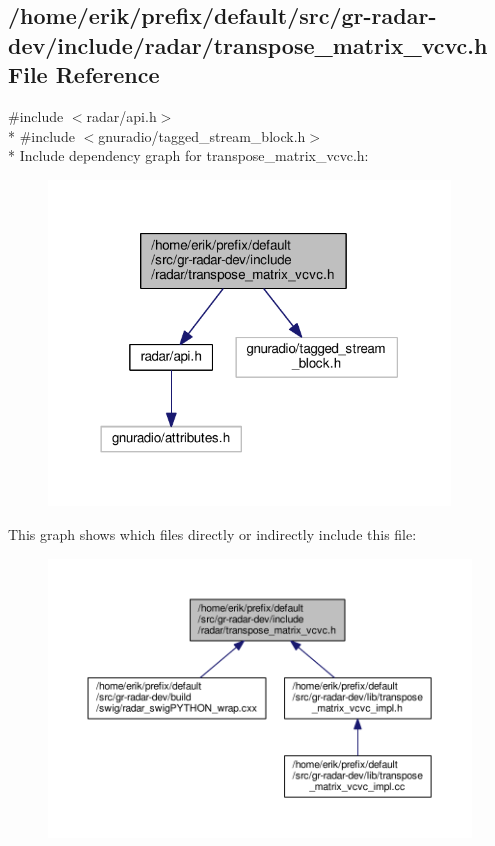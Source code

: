 \subsection{/home/erik/prefix/default/src/gr-\/radar-\/dev/include/radar/transpose\+\_\+matrix\+\_\+vcvc.h File Reference}
\label{transpose__matrix__vcvc_8h}
{\ttfamily \#include $<$radar/api.\+h$>$}\\*
{\ttfamily \#include $<$gnuradio/tagged\+\_\+stream\+\_\+block.\+h$>$}\\*
Include dependency graph for transpose\+\_\+matrix\+\_\+vcvc.\+h\+:
\nopagebreak
\begin{figure}[H]
\begin{center}
\leavevmode
\includegraphics[width=302pt]{de/d64/transpose__matrix__vcvc_8h__incl}
\end{center}
\end{figure}
This graph shows which files directly or indirectly include this file\+:
\nopagebreak
\begin{figure}[H]
\begin{center}
\leavevmode
\includegraphics[width=350pt]{dc/dd4/transpose__matrix__vcvc_8h__dep__incl}
\end{center}
\end{figure}
